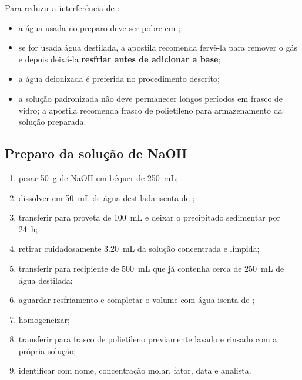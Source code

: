 \documentclass[a4paper,12pt]{article}
\begin{document}
\begin{memorize}
Para reduzir a interferência de :
\begin{itemize}[leftmargin=1.6em]
    \item a água usada no preparo deve ser pobre em ;
    \item se for usada água destilada, a apostila recomenda fervê-la para remover o gás e depois deixá-la \textbf{resfriar antes de adicionar a base};
    \item a água deionizada é preferida no procedimento descrito;
    \item a solução padronizada não deve permanecer longos períodos em frasco de vidro; a apostila recomenda frasco de polietileno para armazenamento da solução preparada.
\end{itemize}
\end{memorize}

\subsection{Preparo da solução de NaOH}

\begin{procedimento}
\begin{enumerate}[leftmargin=1.7em]
    \item pesar \SI{50}{\gram} de NaOH em béquer de \SI{250}{\milli\liter};
    \item dissolver em \SI{50}{\milli\liter} de água destilada isenta de ;
    \item transferir para proveta de \SI{100}{\milli\liter} e deixar o precipitado sedimentar por \SI{24}{\hour};
    \item retirar cuidadosamente \SI{3.20}{\milli\liter} da solução concentrada e límpida;
    \item transferir para recipiente de \SI{500}{\milli\liter} que já contenha cerca de \SI{250}{\milli\liter} de água destilada;
    \item aguardar resfriamento e completar o volume com água isenta de ;
    \item homogeneizar;
    \item transferir para frasco de polietileno previamente lavado e rinsado com a própria solução;
    \item identificar com nome, concentração molar, fator, data e analista.
\end{enumerate}
\end{procedimento}
\end{document}
